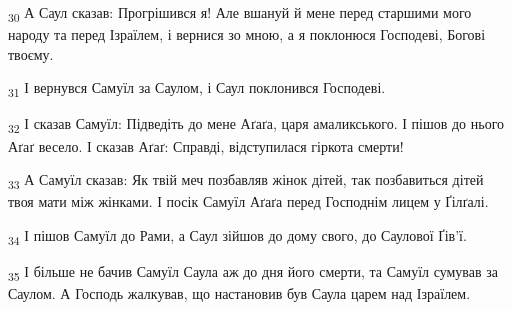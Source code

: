 \begin{tcolorbox}
\textsubscript{30} А Саул сказав: Прогрішився я! Але вшануй й мене перед старшими мого народу та перед Ізраїлем, і вернися зо мною, а я поклонюся Господеві, Богові твоєму.
\end{tcolorbox}
\begin{tcolorbox}
\textsubscript{31} І вернувся Самуїл за Саулом, і Саул поклонився Господеві.
\end{tcolorbox}
\begin{tcolorbox}
\textsubscript{32} І сказав Самуїл: Підведіть до мене Аґаґа, царя амаликського. І пішов до нього Аґаґ весело. І сказав Аґаґ: Справді, відступилася гіркота смерти!
\end{tcolorbox}
\begin{tcolorbox}
\textsubscript{33} А Самуїл сказав: Як твій меч позбавляв жінок дітей, так позбавиться дітей твоя мати між жінками. І посік Самуїл Аґаґа перед Господнім лицем у Ґілґалі.
\end{tcolorbox}
\begin{tcolorbox}
\textsubscript{34} І пішов Самуїл до Рами, а Саул зійшов до дому свого, до Саулової Ґів'ї.
\end{tcolorbox}
\begin{tcolorbox}
\textsubscript{35} І більше не бачив Самуїл Саула аж до дня його смерти, та Самуїл сумував за Саулом. А Господь жалкував, що настановив був Саула царем над Ізраїлем.
\end{tcolorbox}
